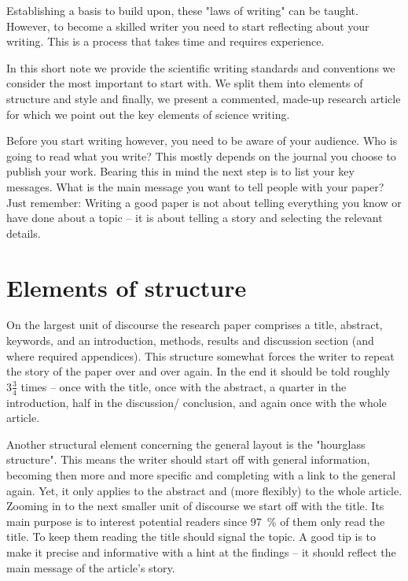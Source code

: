 \documentclass[justified, notoc]{tufte-book} %
\begin{document}
Establishing a basis to build upon, these "laws of writing" can be taught. However, to become a skilled writer you need to start reflecting about your writing. This is a process that takes time and requires experience. 

In this short note we provide the scientific writing standards and conventions we consider the most important to start with. We split them into elements of structure and style and finally, we present a commented, made-up research article for which we point out the key elements of science writing.

Before you start writing however, you need to be aware of your audience. Who is going to read what you write? This mostly depends on the journal you choose to publish your work. Bearing this in mind the next step is to list your key messages. What is the main message you want to tell people with your paper? Just remember: Writing a good paper is not about telling everything you know or have done about a topic -- it is about telling a story and selecting the relevant details.

\chapter{Elements of structure}   
On the largest unit of discourse the research paper comprises a title, abstract, keywords, and an introduction, methods, results and discussion section (and where required appendices). 
This structure somewhat forces the writer to repeat the story of the paper over and over again. In the end  it should be told roughly $3\frac{3}{4}$ times -- once with the title, once with the abstract, a quarter in the introduction, half in the discussion/ conclusion, and again once with the whole article.

Another structural element concerning the general layout is the "hourglass structure". This means the writer should start off with general information, becoming then more and more specific and completing with a link to the general again. Yet, it only applies to the abstract and (more flexibly) to the whole article.\\
 
Zooming in to the next smaller unit of discourse we start off with the title. Its main purpose is to interest potential readers since 97~\%  of them only read the title. To keep them reading the title should signal the topic. A good tip is to make it precise and informative with a hint at the findings -- it should reflect the main message of the article's story.\\
\end{document}

